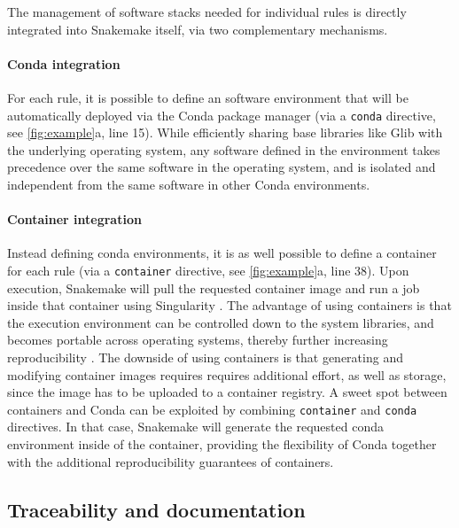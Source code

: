 \documentclass[parskip=half]{scrartcl}
\begin{document}
The management of software stacks needed for individual rules is directly integrated into Snakemake itself, via two complementary mechanisms.

\paragraph{Conda integration}

For each rule, it is possible to define an software environment that will be automatically deployed via the Conda package manager (via a \lstinline!conda! directive, see \autoref{fig:example}a, line 15).
While efficiently sharing base libraries like Glib with the underlying operating system, any software defined in the environment takes precedence over the same software in the operating system, and is isolated and independent from the same software in other Conda environments.

\paragraph{Container integration}

Instead defining conda environments, it is as well possible to define a container for each rule (via a \lstinline!container! directive, see \autoref{fig:example}a, line 38).
Upon execution, Snakemake will pull the requested container image and run a job inside that container using Singularity \parencite{kurtzer_singularity_2017}.
The advantage of using containers is that the execution environment can be controlled down to the system libraries, and becomes portable across operating systems, thereby further increasing reproducibility \parencite{gruning_practical_2018}.
The downside of using containers is that generating and modifying container images requires requires additional effort, as well as storage, since the image has to be uploaded to a container registry.
A sweet spot between containers and Conda can be exploited by combining \lstinline!container! and \lstinline!conda! directives.
In that case, Snakemake will generate the requested conda environment inside of the container, providing the flexibility of Conda together with the additional reproducibility guarantees of containers.

\subsection{Traceability and documentation}
\end{document}
